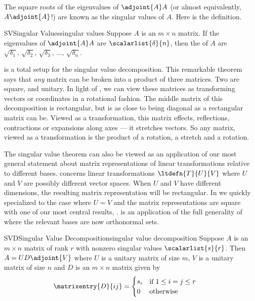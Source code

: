 %
%
The square roots of the eigenvalues of $\adjoint{A}A$ (or almost equivalently, $A\adjoint{A}$!) are known as the singular values of $A$.  Here is the definition.
%
\begin{definition}{SV}{Singular Values}{singular values}
Suppose $A$ is an $m\times n$ matrix.  If the eigenvalues of $\adjoint{A}A$ are $\scalarlist{\delta}{n}$, then the  of $A$ are $\sqrt{\delta_1},\,\sqrt{\delta_2},\,\sqrt{\delta_3},\,\ldots,\,\sqrt{\delta_n}$.
\end{definition}
%
 is a total setup for the singular value decomposition.  This remarkable theorem says that {\em any} matrix can be broken into a product of three matrices.  Two are square, and unitary.  In light of , we can view these matrices as transforming vectors or coordinates in a rotational fashion.  The middle matrix of this decomposition is rectangular, but is as close to being diagonal as a rectangular matrix can be.  Viewed as a transformation, this matrix effects, reflections, contractions or expansions along axes --- it stretches vectors.  So any matrix, viewed as a transformation is the product of a rotation, a stretch and a rotation.\par
%
The singular value theorem can also be viewed as an application of our most general statement about matrix representations of linear transformations relative to different bases.   concerns linear transformations $\ltdefn{T}{U}{V}$ where $U$ and $V$ are possibly different vector spaces.  When $U$ and $V$ have different dimensions, the resulting matrix representation will be rectangular.  In  we quickly specialized to the case where $U=V$ and the matrix representations are square with one of our most central results, .   is an application of the full generality of  where the relevant bases are now orthonormal sets.
%
\begin{theorem}{SVD}{Singular Value Decomposition}{singular value decomposition}
Suppose $A$ is an $m\times n$ matrix of rank $r$ with nonzero singular values $\scalarlist{s}{r}$.  Then $A=UD\adjoint{V}$ where $U$ is a unitary matrix of size $m$, $V$ is a unitary matrix of size $n$ and $D$ is an $m\times n$ matrix given by
%
\begin{align*}
\matrixentry{D}{ij}&=
\begin{cases}
s_i&\text{if }1\leq i=j\leq r\\
0&\text{otherwise}
\end{cases}
\end{align*}
%
\end{theorem}
